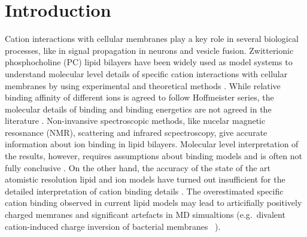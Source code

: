 \documentclass[aip,jcp,twocolumn]{revtex4}
\begin{document}
\section{Introduction}
Cation interactions with cellular membranes play a key role in several biological processes,
like in signal propagation in neurons and vesicle fusion.
Zwitterionic phosphocholine (PC) lipid bilayers have been widely used as model systems
to understand molecular level details of specific cation interactions with
cellular membranes by using experimental \cite{cevc90,tocanne90,binder02,pabst07,uhrikova08}
and theoretical methods \cite{bockmann03,bockmann04,Berkowitz12,??} 
.
While relative binding affinity of different ions is agreed to follow Hoffmeister
series, the molecular details of binding and binding energetics are
not agreed in the literature \cite{cevc90,tocanne90,seelig90,binder02,catte16,??}.
Non-invansive spectroscopic methods, like nucelar magnetic resosnance (NMR), scattering
and infrared scpectroscopy, give accurate information about ion binding
in lipid bilayers\cite{hauser76,hauser78,herbette84,akutsu81,altenbach84,binder02}. 
Molecular level interpretation of the results, however, requires assumptions
about binding models and is often not fully conclusive \cite{??}.
On the other hand, the accuracy of the state of the art atomistic resolution lipid and ion models
have turned out insufficient for the detailed interpretation of cation binding details \cite{catte16}.
The overestimated specific cation binding observed in current lipid models \cite{catte16}
may lead to articifially positively charged memranes and significant artefacts in
MD simualtions (e.g.~divalent cation-induced charge inversion of bacterial membranes~\cite{Luan2016}
). 
\end{document}
